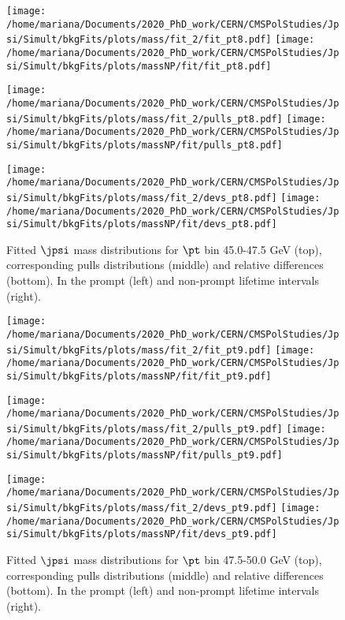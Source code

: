 \pagebreak

\begin{figure}[h!]
\centering
\texttt{[image: /home/mariana/Documents/2020\_PhD\_work/CERN/CMSPolStudies/Jpsi/Simult/bkgFits/plots/mass/fit\_2/fit\_pt8.pdf]}
\texttt{[image: /home/mariana/Documents/2020\_PhD\_work/CERN/CMSPolStudies/Jpsi/Simult/bkgFits/plots/massNP/fit/fit\_pt8.pdf]}

\texttt{[image: /home/mariana/Documents/2020\_PhD\_work/CERN/CMSPolStudies/Jpsi/Simult/bkgFits/plots/mass/fit\_2/pulls\_pt8.pdf]}
\texttt{[image: /home/mariana/Documents/2020\_PhD\_work/CERN/CMSPolStudies/Jpsi/Simult/bkgFits/plots/massNP/fit/pulls\_pt8.pdf]}

\texttt{[image: /home/mariana/Documents/2020\_PhD\_work/CERN/CMSPolStudies/Jpsi/Simult/bkgFits/plots/mass/fit\_2/devs\_pt8.pdf]}
\texttt{[image: /home/mariana/Documents/2020\_PhD\_work/CERN/CMSPolStudies/Jpsi/Simult/bkgFits/plots/massNP/fit/devs\_pt8.pdf]}
\caption{Fitted $\jpsi$ mass distributions for $\pt$ bin 45.0-47.5 GeV (top), corresponding pulls distributions (middle) and relative differences (bottom). In the prompt (left) and non-prompt lifetime intervals (right).}\label{f:m_fit_8}
\end{figure}

\pagebreak

\begin{figure}[h!]
\centering
\texttt{[image: /home/mariana/Documents/2020\_PhD\_work/CERN/CMSPolStudies/Jpsi/Simult/bkgFits/plots/mass/fit\_2/fit\_pt9.pdf]}
\texttt{[image: /home/mariana/Documents/2020\_PhD\_work/CERN/CMSPolStudies/Jpsi/Simult/bkgFits/plots/massNP/fit/fit\_pt9.pdf]}

\texttt{[image: /home/mariana/Documents/2020\_PhD\_work/CERN/CMSPolStudies/Jpsi/Simult/bkgFits/plots/mass/fit\_2/pulls\_pt9.pdf]}
\texttt{[image: /home/mariana/Documents/2020\_PhD\_work/CERN/CMSPolStudies/Jpsi/Simult/bkgFits/plots/massNP/fit/pulls\_pt9.pdf]}

\texttt{[image: /home/mariana/Documents/2020\_PhD\_work/CERN/CMSPolStudies/Jpsi/Simult/bkgFits/plots/mass/fit\_2/devs\_pt9.pdf]}
\texttt{[image: /home/mariana/Documents/2020\_PhD\_work/CERN/CMSPolStudies/Jpsi/Simult/bkgFits/plots/massNP/fit/devs\_pt9.pdf]}
\caption{Fitted $\jpsi$ mass distributions for $\pt$ bin 47.5-50.0 GeV (top), corresponding pulls distributions (middle) and relative differences (bottom). In the prompt (left) and non-prompt lifetime intervals (right).}\label{f:m_fit_9}
\end{figure}

